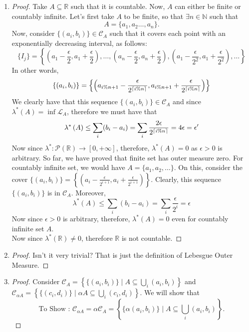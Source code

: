 \documentclass{article}
\theoremstyle{definition}
\theoremstyle{remark}
\theoremstyle{definition}
\theoremstyle{definition}
\theoremstyle{definition}
\newcommand{\bunion}{\bigcup}
\newcommand{\where}{\;\vert\;}
\newcommand{\R}{\mathbb{R}}
\newcommand{\N}{\mathbb{N}}
\newcommand{\pow}[1]{\mathscr{P}\left (#1\right )}
\newcommand{\lom}[1]{\lambda^*\left (#1\right )}
\newcommand{\set}[1]{\mathscr{#1}}
\DeclarePairedDelimiter{\ceil}{\lceil}{\rceil}
\begin{document}
\begin{enumerate}
{\begin{proof}
\end{proof}}
\item {\begin{proof}
		Take $ A\subseteq \R $ such that it is countable. Now, $ A $ can either be finite or countably infinite. Let's first take $ A $ to be finite, so that $ \exists n\in \N $ such that
		\[A = \{a_1,a_2\dots,a_n\}.\]
		Now, consider $ \{(a_i,b_i)\} \in \set{C}_A$ such that it covers each point with an exponentially decreasing interval, as follows:
		\[\{I_j\} = \left \{(a_1-\frac{\epsilon}{2},a_1 + \frac{\epsilon}{2} ), \dots, (a_n - \frac{\epsilon}{2},a_n + \frac{\epsilon}{2}), (a_1 -\frac{\epsilon}{2^2},a_1 + \frac{\epsilon}{2^2}),\dots\right \}\]
		In other words,
		\[\{(a_i,b_i)\} = \left \{ \left (a_{i\%n + 1} - \frac{\epsilon}{2^{\ceil{i\% n}}}, a_{i\%n + 1} + \frac{\epsilon}{2^{\ceil{i\% n}}}\right ) \right \}\]
		We clearly have that this sequence $ \{(a_i,b_i)\}\in \set{C}_A $ and since $ \lom{A} = \inf \set{L}_A $, therefore we must have that 
		\[\lom{A} \le \sum_{i} (b_i - a_i) = \sum_i \frac{2\epsilon}{2^{\ceil{i\%n}}}= 4\epsilon = \epsilon^\prime\]
		Now since $ \lambda^* : \pow{\R} \to [0,+\infty] $, therefore, $ \lom{A} = 0 $ as $ \epsilon >0$ is arbitrary. So far, we have proved that finite set has outer measure zero. For countably infinite set, we would have $ A = \{a_1,a_2,\dots\} $. On this, consider the cover $ \{(a_i,b_i)\} = \left \{\left ( a_i - \frac{\epsilon}{2^{i+1}}, a_i + \frac{\epsilon}{2^{i+1}} \right )\right \} $. Clearly, this sequence $ \{(a_i,b_i)\} $ is in $ \set{C}_A $. Moreover,
		\[\lom{A} \le \sum_i (b_i - a_i) = \sum_i \frac{\epsilon}{2^i} = \epsilon\]
		Now since $ \epsilon >0 $ is arbitrary, therefore, $ \lom{A} = 0 $ even for countably infinite set $ A $.\\
		Now since $ \lom{\R} \neq 0 $, therefore $ \R $ is not countable.
\end{proof}}
\item {\begin{proof}
		Isn't it very trivial? That is just the definition of Lebesgue Outer Measure.
\end{proof}}
\item {\begin{proof}
		Consider $ \set{C}_A = \left \{\{(a_i,b_i)\}\where A \subseteq \bunion_i(a_i,b_i)\right \} $ and $ \set{C}_{\alpha A} = \left \{ \{(c_i,d_i)\}\where \alpha A \subseteq  \bunion_i (c_i,d_i) \right \} $. We will show that 
		\[\text{To Show : }\set{C}_{\alpha A} = \alpha \set{C}_{A} = \left \{\{\alpha(a_i,b_i)\} \where A \subseteq \bunion_i(a_i,b_i)\right \}.\]

\end{proof}}
\end{enumerate}
\end{document}
